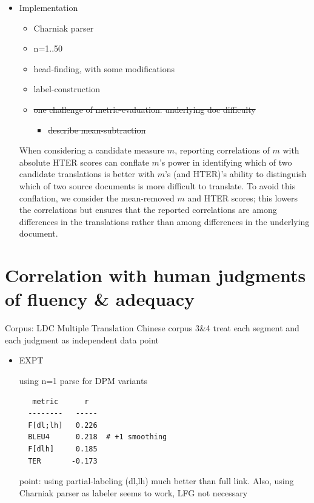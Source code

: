 \documentclass{kluwer}    %
\begin{document}
\begin{article}
\begin{itemize}
\item Implementation
  \begin{itemize}
  \item Charniak parser
  \item n=1..50
  \item head-finding, with some modifications
  \item label-construction
  \end{itemize}

\begin{itemize}
\item \sout{one challenge of metric-evaluation: underlying doc difficulty }
  \begin{itemize}
  \item \sout{describe mean-subtraction}
  \end{itemize}
\end{itemize}
When considering a candidate measure $m$, reporting correlations of
$m$ with absolute HTER scores can conflate $m$'s power in identifying
which of two candidate translations is better with $m$'s (and HTER)'s
ability to distinguish which of two source documents is more difficult
to translate. To avoid this conflation, we consider the mean-removed
$m$ and HTER scores; this lowers the correlations but ensures that the
reported correlations are among differences in the translations rather
than among differences in the underlying document.

\end{itemize}

\section{Correlation with human judgments of fluency \& adequacy}
\label{sec:faexpts}
Corpus: LDC Multiple Translation Chinese corpus 3\&4 treat each
segment and each judgment as independent data point

\begin{itemize}
\item EXPT

  using n=1 parse for DPM variants

\begin{verbatim}
   metric      r
  --------   -----
  F[dl;lh]   0.226
  BLEU4      0.218  # +1 smoothing
  F[dlh]     0.185
  TER       -0.173
\end{verbatim}

  point: using partial-labeling (dl,lh) much better than full
  link. Also, using Charniak parser as labeler seems to work, LFG not
  necessary


\end{itemize}
\end{article}
\end{document}
